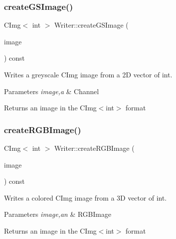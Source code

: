 \subsubsection{\texorpdfstring{create\+G\+S\+Image()}{createGSImage()}}
{\footnotesize\ttfamily C\+Img$<$ int $>$ Writer\+::create\+G\+S\+Image (\begin{DoxyParamCaption}\item[{Channel}]{image }\end{DoxyParamCaption}) const}



Writes a greyscale C\+Img image from a 2D vector of int. 


\begin{DoxyParams}{Parameters}
{\em image,a} & Channel \\
\hline
\end{DoxyParams}
\begin{DoxyReturn}{Returns}
an image in the C\+Img$<$int$>$ format 
\end{DoxyReturn}
\mbox{\label{class_writer_ad5b28e682415d1e47aa9e5d8e43dc217}} 
\subsubsection{\texorpdfstring{create\+R\+G\+B\+Image()}{createRGBImage()}\hspace{0.1cm}{\footnotesize\ttfamily [1/2]}}
{\footnotesize\ttfamily C\+Img$<$ int $>$ Writer\+::create\+R\+G\+B\+Image (\begin{DoxyParamCaption}\item[{R\+G\+B\+Image}]{image }\end{DoxyParamCaption}) const}



Writes a colored C\+Img image from a 3D vector of int. 


\begin{DoxyParams}{Parameters}
{\em image,an} & R\+G\+B\+Image \\
\hline
\end{DoxyParams}
\begin{DoxyReturn}{Returns}
an image in the C\+Img$<$int$>$ format 
\end{DoxyReturn}
\mbox{\label{class_writer_a455f6fe279141be85858d17729d42898}} 
